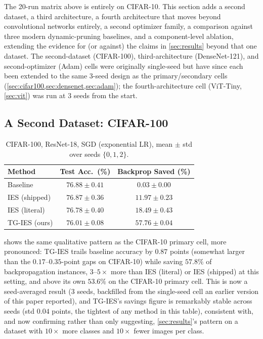 \documentclass{article}
\newcommand{\win}[1]{\cellcolor{tgwin}#1}
\newcommand{\lose}[1]{\cellcolor{tglose}#1}
\theoremstyle{plain}
\theoremstyle{definition}
\theoremstyle{remark}
\begin{document}
The 20-run matrix above is entirely on CIFAR-10. This section adds a second dataset, a third architecture, a fourth architecture that moves beyond convolutional networks entirely, a second optimizer family, a comparison against three modern dynamic-pruning baselines, and a component-level ablation, extending the evidence for (or against) the claims in \cref{sec:results} beyond that one dataset. The second-dataset (CIFAR-100), third-architecture (DenseNet-121), and second-optimizer (Adam) cells were originally single-seed but have since each been extended to the same 3-seed design as the primary/secondary cells (\cref{sec:cifar100,sec:densenet,sec:adam}); the fourth-architecture cell (ViT-Tiny, \cref{sec:vit}) was run at 3 seeds from the start.

\subsection{A Second Dataset: CIFAR-100}
\label{sec:cifar100}

\begin{table}[h]
\caption{CIFAR-100, ResNet-18, SGD (exponential LR), mean $\pm$ std over seeds $\{0,1,2\}$.}
\label{tab:cifar100}
\vskip 0.1in
\begin{center}
\begin{small}
\begin{tabular}{lcc}
\toprule
Method & Test Acc.\ (\%) & Backprop Saved (\%) \\
\midrule
Baseline & $76.88\pm0.41$ & $0.03\pm0.00$ \\
IES (shipped) & $76.87\pm0.36$ & $11.97\pm0.23$ \\
IES (literal) & $76.78\pm0.40$ & $18.49\pm0.43$ \\
\win{TG-IES (ours)} & \lose{$76.01\pm0.08$} & \win{$\mathbf{57.76\pm0.04}$} \\
\bottomrule
\end{tabular}
\end{small}
\end{center}
\vskip -0.1in
\end{table}

 shows the same qualitative pattern as the CIFAR-10 primary cell, more pronounced: TG-IES trails baseline accuracy by $0.87$ points (somewhat larger than the $0.17$--$0.35$-point gaps on CIFAR-10) while saving $57.8\%$ of backpropagation instances, $3$--$5\times$ more than IES (literal) or IES (shipped) at this setting, and above its own $53.6\%$ on the CIFAR-10 primary cell. This is now a seed-averaged result (3 seeds, backfilled from the single-seed cell an earlier version of this paper reported), and TG-IES's savings figure is remarkably stable across seeds (std $0.04$ points, the tightest of any method in this table), consistent with, and now confirming rather than only suggesting, \cref{sec:results}'s pattern on a dataset with $10\times$ more classes and $10\times$ fewer images per class.
\end{document}
